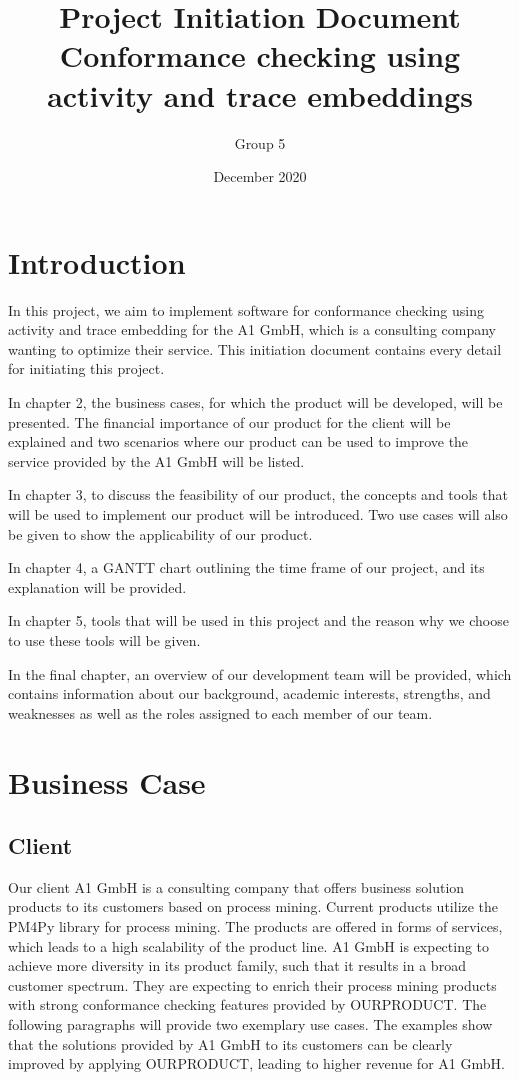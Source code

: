 \documentclass{article}
\title{Project Initiation Document \\ Conformance checking using activity and trace embeddings}
\author{Group 5 }
\date{December 2020}
\begin{document}
\maketitle

\newpage
\tableofcontents
\newpage

\section{Introduction}
In this project, we aim to implement software for conformance checking using activity and trace embedding for the A1 GmbH, which is a consulting company wanting to optimize their service. This initiation document contains every detail for initiating this project.

In chapter 2, the business cases, for which the product will be developed, will be presented. The financial importance of our product for the client will be explained and two scenarios where our product can be used to improve the service provided by the A1 GmbH will be listed.

In chapter 3, to discuss the feasibility of our product, the concepts and tools that will be used to implement our product will be introduced. Two use cases will also be given to show the applicability of our product.

In chapter 4, a GANTT chart outlining the time frame of our project, and its explanation will be provided.

In chapter 5, tools that will be used in this project and the reason why we choose to use these tools will be given.

In the final chapter, an overview of our development team will be provided, which contains information about our background, academic interests, strengths, and weaknesses as well as the roles assigned to each member of our team.

\section{Business Case}
\subsection{Client}
Our client A1 GmbH is a consulting company that offers business solution products to its customers based on process mining. Current products utilize the PM4Py library for process mining. The products are offered in forms of services, which leads to a high scalability of the product line. A1 GmbH is expecting to achieve more diversity in its product family, such that it results in a broad customer spectrum. They are expecting to enrich their process mining products with strong conformance checking features provided by OURPRODUCT. The following paragraphs will provide two exemplary use cases. The examples show that the solutions provided by A1 GmbH to its customers can be clearly improved by applying OURPRODUCT, leading to higher revenue for A1 GmbH.
\end{document}

